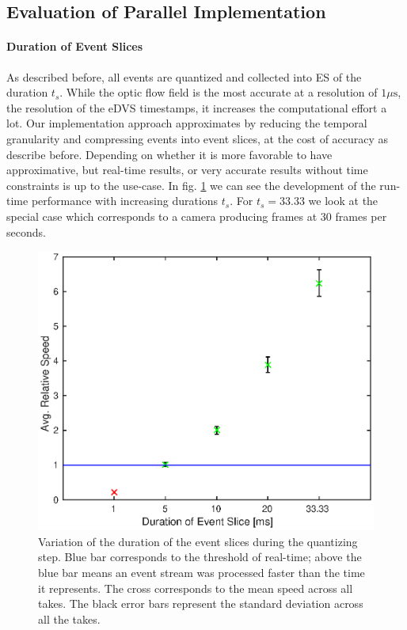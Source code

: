 
\subsection{Evaluation of Parallel Implementation}
\paragraph{Duration of Event Slices}
As described before, all events are quantized and collected into ES of the duration $t_s$.
While the optic flow field is the most accurate at a resolution of $1\mu\mathrm{s}$, the resolution of the eDVS timestamps, it increases the computational effort a lot.
Our implementation approach approximates by reducing the temporal granularity and compressing events into event slices, at the cost of accuracy as describe before.
Depending on whether it is more favorable to have approximative, but real-time results, or very accurate results without time constraints is up to the use-case.
In fig. \ref{fig:gpu_tsd} we can see the development of the run-time performance with increasing durations $t_s$.
For $t_s=33.33$ we look at the special case which corresponds to a camera producing frames at 30 frames per seconds.
\begin{figure}[!htb]
	\centering
	\includegraphics[scale=.9]{gpu_tsd.eps}
	\caption[Variation of the duration of the event slices during the quantizing step]{Variation of the duration of the event slices during the quantizing step. Blue bar corresponds to the threshold of real-time; above the blue bar means an event stream was processed faster than the time it represents. The cross corresponds to the mean speed across all takes. The black error bars represent the standard deviation across all the takes.}
	\label{fig:gpu_tsd}
\end{figure}
